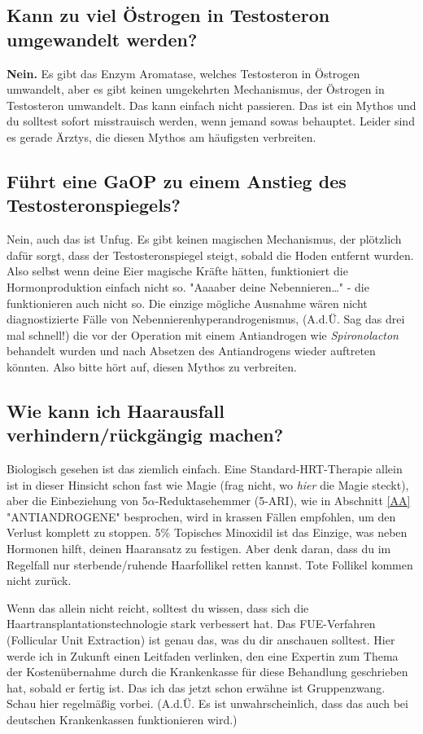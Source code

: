 \documentclass{article}
\begin{document}
\subsection{Kann zu viel Östrogen in Testosteron umgewandelt werden?}

\textbf{Nein.} Es gibt das Enzym Aromatase, welches Testosteron in Östrogen umwandelt, aber es gibt keinen umgekehrten Mechanismus, der Östrogen in Testosteron umwandelt. Das kann einfach nicht passieren. Das ist ein  Mythos und du solltest sofort misstrauisch werden, wenn jemand sowas behauptet. Leider sind es gerade Ärztys, die diesen Mythos am häufigsten verbreiten.

\subsection{Führt eine GaOP zu einem Anstieg des Testosteronspiegels?}

Nein, auch das ist Unfug. Es gibt keinen magischen Mechanismus, der plötzlich dafür sorgt, dass der Testosteronspiegel steigt, sobald die Hoden entfernt wurden. Also selbst wenn deine Eier magische Kräfte hätten, funktioniert die Hormonproduktion einfach nicht so. "Aaaaber deine Nebennieren…" - die funktionieren auch nicht so. Die einzige mögliche Ausnahme wären nicht diagnostizierte Fälle von Nebennierenhyperandrogenismus, (A.d.Ü. Sag das drei mal schnell!) die vor der Operation mit einem Antiandrogen wie \textit{Spironolacton} behandelt wurden und nach Absetzen des Antiandrogens wieder auftreten könnten. Also bitte hört auf, diesen Mythos zu verbreiten.

\subsection{Wie kann ich Haarausfall verhindern/rückgängig machen?}\label{11-14}

Biologisch gesehen ist das ziemlich einfach. Eine Standard-HRT-Therapie allein ist in dieser Hinsicht schon fast wie Magie (frag nicht, wo \textit{hier} die Magie steckt), aber die Einbeziehung von 5$\alpha$-Reduktasehemmer (5-ARI), wie in Abschnitt \ref{AA} "ANTIANDROGENE" besprochen, wird in krassen Fällen empfohlen, um den Verlust komplett zu stoppen. 5\% Topisches Minoxidil ist das Einzige, was neben Hormonen hilft, deinen Haaransatz zu festigen. Aber denk daran, dass du im Regelfall nur sterbende/ruhende Haarfollikel retten kannst. Tote Follikel kommen nicht zurück.

Wenn das allein nicht reicht, solltest du wissen, dass sich die Haartransplantationstechnologie stark verbessert hat. Das FUE-Verfahren (Follicular Unit Extraction) ist genau das, was du dir anschauen solltest. Hier werde ich in Zukunft einen Leitfaden verlinken, den eine Expertin zum Thema der Kostenübernahme durch die Krankenkasse für diese Behandlung geschrieben hat, sobald er fertig ist. Das ich das jetzt schon erwähne ist Gruppenzwang. Schau hier regelmäßig vorbei. (A.d.Ü. Es ist unwahrscheinlich, dass das auch bei deutschen Krankenkassen funktionieren wird.)
\end{document}
